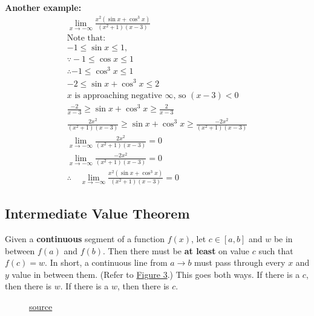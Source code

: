\documentclass[12pt]{article}
\begin{document}
\noindent \textbf{Another example:}
\begin{gather*}
    \lim_{x \to -\infty} \frac{x^2(\sin{x} + \cos^{3}{x})}{(x^2+1)(x-3)} \\[8pt]
    \text{Note that:} \\
    -1 \le \sin{x} \le 1, \\
    \because -1 \le \cos{x} \le {1} \\
    \therefore -1 \le \cos^{3}{x} \le 1 \\
    -2 \le \sin{x} + \cos^{3}{x} \le 2 \\[8pt]
    \text{$x$ is approaching negative $\infty$, so $(x-3) < 0$} \\
    \frac{-2}{x-3} \ge \sin{x} + \cos^{3}{x} \ge \frac{2}{x-3} \\[6pt]
    \frac{2x^2}{(x^2+1)(x-3)} \ge \sin{x} + \cos^{3}{x} \ge \frac{-2x^2}{(x^2+1)(x-3)} \\[10pt]
    \lim_{x \to -\infty}\frac{2x^2}{(x^2+1)(x-3)} = 0 \\[6pt]
    \lim_{x \to -\infty}\frac{-2x^2}{(x^2+1)(x-3)} = 0 \\[6pt]
    \therefore \quad \lim_{x \to -\infty} \frac{x^2(\sin{x} + \cos^{3}{x})}{(x^2+1)(x-3)} = 0
\end{gather*}

\subsection{Intermediate Value Theorem}
Given a \textbf{continuous} segment of a function $f(x)$, let $c \in [a, b]$ and $w$ be in between $f(a)$ and $f(b)$. Then there must be \textbf{at least} on value $c$ such that $f(c) = w$. In short, a continuous line from $a \to b$ must pass through every $x$ and $y$ value in between them. (Refer to \hyperref[fig:intvaltheorem]{Figure 3}.) This goes both ways. If there is a $c$, then there is  $w$. If there is a $w$, then there is $c$.

\begin{figure}[H]
    \begin{center}
        \caption{\href{https://www.mathsisfun.com/algebra/intermediate-value-theorem.html}{source}}
        \label{fig:intvaltheorem}
    \end{center}
\end{figure}
\end{document}
